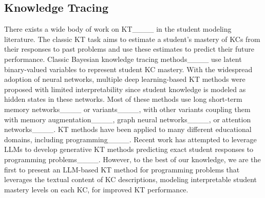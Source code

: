 \subsection{Knowledge Tracing}
There exists a wide body of work on KT____ in the student modeling literature. 
The classic KT task aims to estimate a student's mastery of KCs from their responses to past problems and use these estimates to predict their future performance.
Classic Bayesian knowledge tracing methods____ use latent binary-valued variables to represent student KC mastery.
With the widespread adoption of neural networks, multiple deep learning-based KT methods were proposed with limited interpretability since student knowledge is modeled as hidden states in these networks.
Most of these methods use long short-term memory networks____ or variants____, with other variants coupling them with memory augmentation____, graph neural networks____, or attention networks____.
KT methods have been applied to many different educational domains, including programming____. Recent work has attempted to leverage LLMs to develop generative KT methods predicting exact student responses to programming problems____. However, to the best of our knowledge, we are the first to present an LLM-based KT method for programming problems that leverages the textual content of KC descriptions, modeling interpretable student mastery levels on each KC, for improved KT performance.